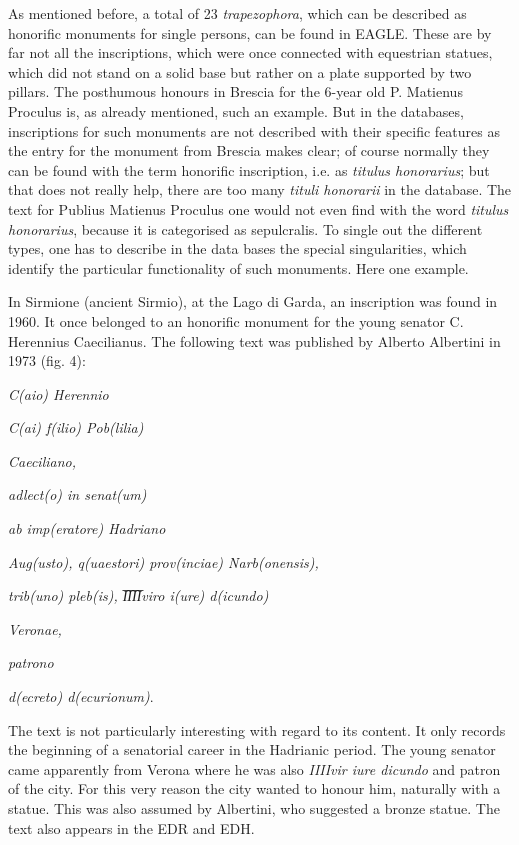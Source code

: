 \documentclass{article}
\begin{document}
As mentioned before, a total of 23 \textit{trapezophora}, which can be described 
as honorific monuments for single persons, can be found in EAGLE. These are by 
far not all the inscriptions, which were once connected with equestrian statues, 
which did not stand on a solid base but rather on a plate supported by two pillars. 
The posthumous honours in Brescia for the 6-year old P. Matienus Proculus is, as 
already mentioned, such an example. But in the databases, inscriptions for such 
monuments are not described with their specific features\textbf{ }as\textbf{ }the 
entry for the monument from Brescia makes clear; of course normally they can be 
found with the term honorific inscription, i.e. as \textit{titulus honorarius}; 
but that does not really help, there are too many \textit{tituli honorarii }in 
the database. The text for Publius Matienus Proculus one would not even find with 
the word \textit{titulus honorarius}, because it is categorised as sepulcralis. 
To single out the different types, one has to describe in the data bases the special 
singularities, which identify the particular functionality of such monuments. Here 
one example. 

In Sirmione (ancient Sirmio), at the Lago di Garda, an inscription was found in 
1960. It once belonged to an honorific monument for the young senator C. Herennius 
Caecilianus. The following text was published by Alberto Albertini in 1973 (fig. 
4):

\textit{C(aio) Herennio}

\textit{C(ai) f(ilio) Pob(lilia)}

\textit{Caeciliano,}

\textit{adlect(o) in senat(um)}

\textit{ab imp(eratore) Hadriano}

\textit{Aug(usto), q(uaestori) prov(inciae) Narb(onensis),}

\textit{trib(uno) pleb(is), I̅I̅I̅I̅viro i(ure) d(icundo)}

\textit{Veronae,}

\textit{patrono}

\textit{d(ecreto) d(ecurionum)}.

The text is not particularly interesting with regard to its content. It only records 
the beginning of a senatorial career in the Hadrianic period. The young senator 
came apparently from Verona where he was also \textit{IIIIvir iure dicundo }and 
patron of the city. For this very reason the city wanted to honour him, naturally 
with a statue. This was also assumed by Albertini, who suggested a bronze statue. 
The text also appears in the EDR and EDH.  
\end{document}
